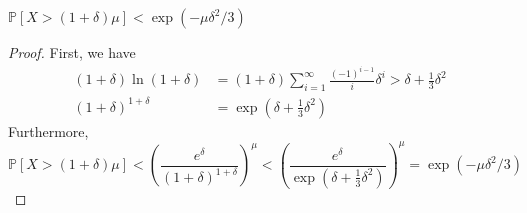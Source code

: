 \documentclass[11pt]{article}
\begin{document}
\begin{qparts}
    
    \item $\mathbb{P}\left[ X>(1+\delta)\mu \right]<\exp(-\mu \delta^{2} / 3)$
    \begin{proof}
        First, we have 
        \begin{align*}
            (1+\delta)\ln(1+\delta)&=(1+\delta)\sum_{i=1}^{\infty}\frac{(-1)^{i-1}}{i}\delta ^{i}>\delta+\frac{1}{3}\delta^{2}\\
            (1+\delta)^{1+\delta}&=\exp(\delta+\frac{1}{3}\delta^{2})
        \end{align*}
        Furthermore, 
        $$
        \mathbb{P}\left[ X>(1+\delta)\mu \right]<\left( \frac{e^{\delta}}{(1+\delta)^{1+\delta}} \right)^{\mu} <
        \left( \frac{e^{\delta}}{\exp(\delta+\frac{1}{3}\delta^{2})} \right)^{\mu} =\exp(-\mu \delta^{2} / 3)
        $$
    \end{proof}
\end{qparts}
\end{document}
